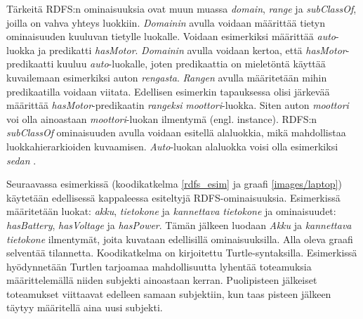 \documentclass[finnish, 12pt, a4paper, elec, utf8, pdfa, online]{aaltothesis}
\begin{document}
{Tärkeitä RDFS:n ominaisuuksia ovat muun muassa \textit{domain}, \textit{range} ja \textit{subClassOf}, joilla on vahva yhteys luokkiin. \textit{Domainin} avulla voidaan määrittää tietyn ominaisuuden kuuluvan tietylle luokalle. Voidaan esimerkiksi määrittää \textit{auto}-luokka ja predikatti \textit{hasMotor}. \textit{Domainin} avulla voidaan kertoa, että \textit{hasMotor}-predikaatti kuuluu \textit{auto}-luokalle, joten predikaattia on mieletöntä käyttää kuvailemaan esimerkiksi auton \textit{rengasta}. \textit{Rangen} avulla määritetään mihin predikaatilla voidaan viitata. Edellisen esimerkin tapauksessa olisi järkevää määrittää \textit{hasMotor}-predikaatin \textit{rangeksi} \textit{moottori}-luokka. Siten auton \textit{moottori} voi olla ainoastaan \textit{moottori}-luokan ilmentymä (engl. instance). RDFS:n \textit{subClassOf} ominaisuuden avulla voidaan esitellä alaluokkia, mikä mahdollistaa luokkahierarkioiden kuvaamisen. \textit{Auto}-luokan alaluokka voisi olla esimerkiksi \textit{sedan}
\cite{W3C_RDFS2}.

Seuraavassa esimerkissä (koodikatkelma \ref{rdfs_esim} ja graafi \ref{images/laptop}) käytetään edellisessä kappaleessa esiteltyjä RDFS-ominaisuuksia. Esimerkissä määritetään luokat: \textit{akku}, \textit{tietokone} ja \textit{kannettava tietokone} ja ominaisuudet: \textit{hasBattery}, \textit{hasVoltage} ja \textit{hasPower}. Tämän jälkeen luodaan \textit{Akku} ja \textit{kannettava tietokone} ilmentymät, joita kuvataan edellisillä ominaisuuksilla. Alla oleva graafi selventää tilannetta. Koodikatkelma on kirjoitettu Turtle-syntaksilla. Esimerkissä hyödynnetään Turtlen tarjoamaa mahdollisuutta lyhentää toteamuksia määrittelemällä niiden subjekti ainoastaan kerran. Puolipisteen jälkeiset toteamukset viittaavat edelleen samaan subjektiin, kun taas pisteen jälkeen täytyy määritellä aina uusi subjekti.

}
\end{document}
